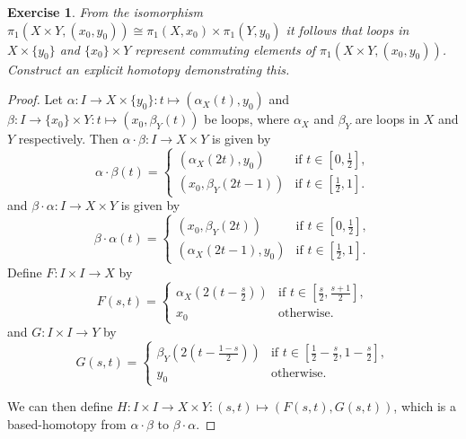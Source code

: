 \documentclass{article}
\newtheorem{exercise}{Exercise}[subsection]
\begin{document}
\begin{exercise}
From the isomorphism $\pi_1(X\times Y,(x_0,y_0))\cong \pi_1(X,x_0)\times\pi_1(Y,y_0)$ it follows that loops in $X\times\{y_0\}$ and $\{x_0\}\times Y$ represent commuting elements of $\pi_1(X\times Y,(x_0,y_0))$. Construct an explicit homotopy demonstrating this.
\end{exercise}
\begin{proof}
Let $\alpha:I\to X\times\{y_0\}:t\mapsto(\alpha_X(t),y_0)$ and $\beta:I\to \{x_0\}\times Y:t\mapsto(x_0,\beta_Y(t))$ be loops, where $\alpha_X$ and $\beta_Y$ are loops in $X$ and $Y$ respectively. Then $\alpha\cdot\beta:I\to X\times Y$ is given by \[\alpha\cdot\beta(t)=\begin{cases}
    (\alpha_X(2t),y_0)&\text{if }t\in[0,\frac{1}{2}],\\(x_0,\beta_Y(2t-1))&\text{if }t\in[\frac{1}{2},1].
\end{cases}\]
and $\beta\cdot\alpha:I\to X\times Y$ is given by \[\beta\cdot\alpha(t)=\begin{cases}
    (x_0,\beta_Y(2t))&\text{if }t\in[0,\frac{1}{2}],\\(\alpha_X(2t-1),y_0)&\text{if }t\in[\frac{1}{2},1].
\end{cases}\] Define $F:I\times I\to X$ by \[F(s,t)=\begin{cases}
    \alpha_X(2(t-\frac{s}{2}))&\text{if }t\in[\frac{s}{2},\frac{s+1}{2}],\\
    x_0&\text{otherwise}.
\end{cases}\]and $G:I\times I\to Y$ by\[G(s,t)=\begin{cases}
    \beta_Y(2(t-\frac{1-s}{2}))&\text{if }t\in[\frac{1}{2}-\frac{s}{2},1-\frac{s}{2}],\\
    y_0&\text{otherwise}.
\end{cases}\]

We can then define $H:I\times I\to X\times Y:(s,t)\mapsto(F(s,t),G(s,t))$, which is a based-homotopy from $\alpha\cdot\beta$ to $\beta\cdot\alpha$.
\end{proof}
\end{document}
